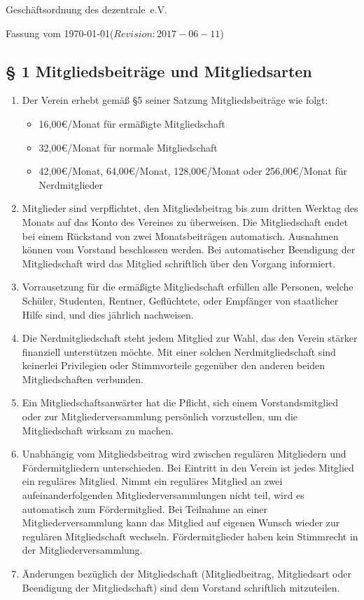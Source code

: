 \documentclass[10pt,a4paper]{article}
\newcommand{\name}{dezentrale}
\newcommand{\revision}{$Revision: 2017-06-11$}
\begin{document}
{\LARGE Geschäftsordnung des \name\ e.V.}

Fassung vom \today (\revision)
%
%
\subsection*{§ 1 Mitgliedsbeiträge und Mitgliedsarten}
\begin{enumerate}
\item Der Verein erhebt gemäß §5 seiner Satzung Mitgliedsbeiträge wie folgt:
	\begin{itemize}
    \item 16,00€/Monat für ermäßigte Mitgliedschaft
    \item 32,00€/Monat für normale Mitgliedschaft
	\item 42,00€/Monat, 64,00€/Monat, 128,00€/Monat oder 256,00€/Monat für Nerdmitglieder
	\end{itemize}
    

    \item Mitglieder sind verpflichtet, den Mitgliedsbeitrag bis zum dritten Werktag des Monats
    auf das Konto des Vereines zu überweisen. Die Mitgliedschaft endet bei einem Rückstand
    von zwei Monatsbeiträgen automatisch. Ausnahmen können vom Vorstand beschlossen werden.
    Bei automatischer Beendigung der Mitgliedschaft wird das Mitglied schriftlich über den
    Vorgang informiert.

    \item Vorrausetzung für die ermäßigte Mitgliedschaft erfüllen alle Personen, welche Schüler, Studenten,
    Rentner, Geflüchtete, oder Empfänger von staatlicher Hilfe sind, und dies jährlich nachweisen.

\item Die Nerdmitgliedschaft steht jedem Mitglied zur Wahl, das den Verein stärker
	finanziell unterstützen möchte. Mit einer solchen
	Nerdmitgliedschaft sind keinerlei Privilegien oder Stimmvorteile gegenüber
	den anderen beiden Mitgliedschaften verbunden.
    
    \item Ein Mitgliedschaftsanwärter hat die Pflicht, sich einem Vorstandsmitglied oder zur 
    Mitgliederversammlung persönlich vorzustellen, um die Mitgliedschaft wirksam zu machen.
    \item Unabhängig vom Mitgliedsbeitrag wird zwischen regulären Mitgliedern und Fördermitgliedern
    unterschieden. Bei Eintritt in den Verein ist jedes Mitglied ein reguläres Mitglied.
    Nimmt ein reguläres Mitglied an zwei aufeinanderfolgenden Mitgliederversammlungen nicht
    teil, wird es automatisch zum Fördermitglied. Bei Teilnahme an einer Mitgliederversammlung
    kann das Mitglied auf eigenen Wunsch wieder zur regulären Mitgliedschaft wechseln.
    Fördermitglieder haben kein Stimmrecht in der Mitgliederversammlung.

    
\item Änderungen bezüglich der Mitgliedschaft (Mitgliedbeitrag, Mitgliedsart oder Beendigung der Mitgliedschaft)
	sind dem Vorstand schriftlich mitzuteilen.
\end{enumerate}
%
%
\end{document}
